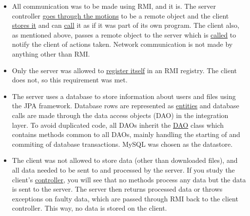 \documentclass[a4paper]{scrartcl}
\begin{document}
\begin{itemize}
    \item All communication was to be made using RMI, and it is. The server controller \href{https://github.com/fongie/Filehandler/blob/master/filehandler_server/src/main/java/controller/ServerController.java#L18}{goes through the motions} to be a remote object and the client \href{https://github.com/fongie/Filehandler/blob/master/filehandler_client/src/main/java/controller/Controller.java#L164}{stores it} and can \href{https://github.com/fongie/Filehandler/blob/master/filehandler_client/src/main/java/controller/Controller.java#L131}{call} it as if it was part of its own program. The client also, as mentioned above, passes a remote object to the server which is \href{https://github.com/fongie/Filehandler/blob/master/filehandler_server/src/main/java/model/Client.java#L19}{called} to notify the client of actions taken. Network communication is not made by anything other than RMI.
    
    \item Only the server was allowed to \href{https://github.com/fongie/Filehandler/blob/master/filehandler_server/src/main/java/startup/StartServer.java}{register itself} in an RMI registry. The client does not, so this requirement was met.
    
    \item The server uses a database to store information about users and files using the JPA framework. Database rows are represented as \href{https://github.com/fongie/Filehandler/tree/master/filehandler_server/src/main/java/entities}{entities} and database calls are made through the data access objects (DAO) in the integration layer. To avoid duplicated code, all DAOs inherit the \href{https://github.com/fongie/Filehandler/blob/master/filehandler_server/src/main/java/integration/DAO.java}{DAO} class which contains methods common to all DAOs, mainly handling the starting of and commiting of database transactions. MySQL was chosen as the datastore.
    
    \item The client was not allowed to store data (other than downloaded files), and all data needed to be sent to and processed by the server. If you study the client's \href{https://github.com/fongie/Filehandler/blob/master/filehandler_client/src/main/java/controller/Controller.java}{controller}, you will see that no methods process any data but the data is sent to the server. The server then returns processed data or throws exceptions on faulty data, which are passed through RMI back to the client controller. This way, no data is stored on the client.
    

\end{itemize}
\end{document}
